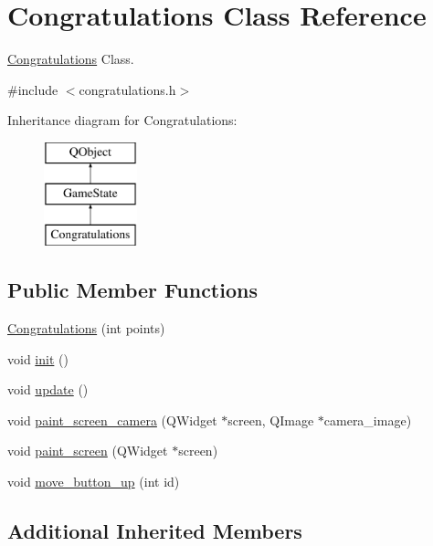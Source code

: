 \hypertarget{class_congratulations}{\section{Congratulations Class Reference}
\label{class_congratulations}
}


\hyperlink{class_congratulations}{Congratulations} Class.  




{\ttfamily \#include $<$congratulations.\-h$>$}

Inheritance diagram for Congratulations\-:\begin{figure}[H]
\begin{center}
\leavevmode
\includegraphics[height=3.000000cm]{class_congratulations}
\end{center}
\end{figure}
\subsection*{Public Member Functions}
\begin{DoxyCompactItemize}
\item 
\hyperlink{class_congratulations_a0a00d803843dff911c2e5c97f87d18ce}{Congratulations} (int points)
\item 
void \hyperlink{class_congratulations_a6c734c4ef2643aa508a268c9fc212cc7}{init} ()
\item 
void \hyperlink{class_congratulations_a2dc0a7638d81154f64776b4f964a6a5b}{update} ()
\item 
void \hyperlink{class_congratulations_a417ebf58b174b09ba82b6e0ce7fa0605}{paint\-\_\-screen\-\_\-camera} (Q\-Widget $\ast$screen, Q\-Image $\ast$camera\-\_\-image)
\item 
void \hyperlink{class_congratulations_a0a50bb9e925839c339015766ff24539c}{paint\-\_\-screen} (Q\-Widget $\ast$screen)
\item 
void \hyperlink{class_congratulations_ac8c8ec11538dacf2485d8f487a5c83dd}{move\-\_\-button\-\_\-up} (int id)
\end{DoxyCompactItemize}
\subsection*{Additional Inherited Members}


